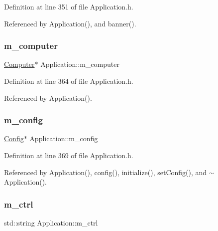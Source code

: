 Definition at line 351 of file Application.\+h.



Referenced by Application(), and banner().

\mbox{\label{classApplication_a17c9fd27b6abbc18abb6d5de5d7648ef}} 
\subsubsection{\texorpdfstring{m\+\_\+computer}{m\_computer}}
{\footnotesize\ttfamily \hyperlink{classComputer}{Computer}$\ast$ Application\+::m\+\_\+computer\hspace{0.3cm}{\ttfamily [private]}}



Definition at line 364 of file Application.\+h.



Referenced by Application().

\mbox{\label{classApplication_ae05f3e253ea871a194c3d30fd1d3b0c3}} 
\subsubsection{\texorpdfstring{m\+\_\+config}{m\_config}}
{\footnotesize\ttfamily \hyperlink{classConfig}{Config}$\ast$ Application\+::m\+\_\+config\hspace{0.3cm}{\ttfamily [private]}}



Definition at line 369 of file Application.\+h.



Referenced by Application(), config(), initialize(), set\+Config(), and $\sim$\+Application().

\mbox{\label{classApplication_aa371ed989ed34038df400c4d1b41b37f}} 
\subsubsection{\texorpdfstring{m\+\_\+ctrl}{m\_ctrl}}
{\footnotesize\ttfamily std\+::string Application\+::m\+\_\+ctrl\hspace{0.3cm}{\ttfamily [private]}}



